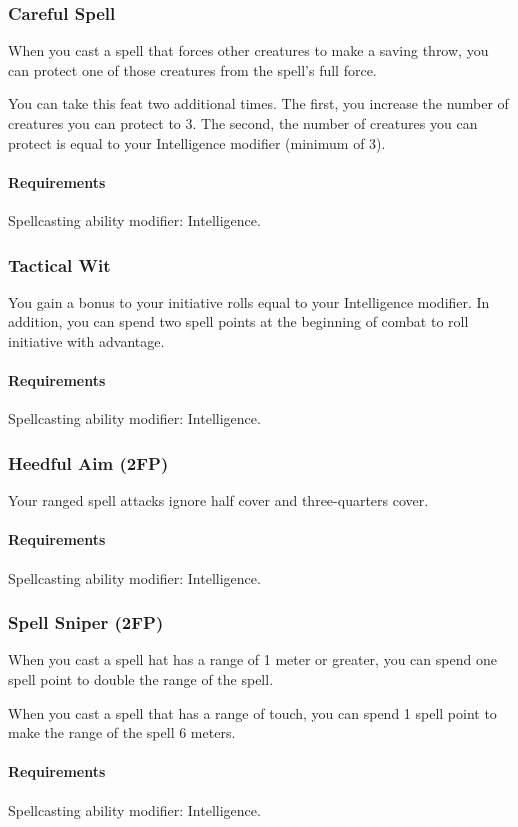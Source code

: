 \subsubsection{Careful Spell} \label{feat::carefulspell}
    When you cast a spell that forces other creatures to make a saving throw, you can protect one of those creatures from the spell's full force.

    You can take this feat two additional times.
    The first, you increase the number of creatures you can protect to 3.
    The second, the number of creatures you can protect is equal to your Intelligence modifier (minimum of 3).
    \paragraph{Requirements} Spellcasting ability modifier: Intelligence.
\subsubsection{Tactical Wit} \label{feat::tacticalwit}
    You gain a bonus to your initiative rolls equal to your Intelligence modifier.
    In addition, you can spend two spell points at the beginning of combat to roll initiative with advantage.
    \paragraph{Requirements} Spellcasting ability modifier: Intelligence.
\subsubsection{Heedful Aim (2FP)} \label{feat::heedfulaim}
    Your ranged spell attacks ignore half cover and three-quarters cover.
    \paragraph{Requirements} Spellcasting ability modifier: Intelligence.
\subsubsection{Spell Sniper (2FP)} \label{feat::spellsniper}
    When you cast a spell hat has a range of 1 meter or greater, you can spend one spell point to double the range of the spell.

    When you cast a spell that has a range of touch, you can spend 1 spell point to make the range of the spell 6 meters.
    \paragraph{Requirements} Spellcasting ability modifier: Intelligence.

